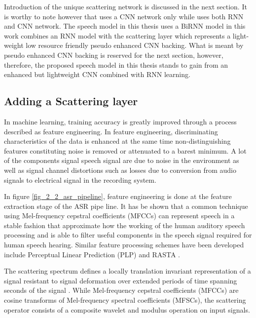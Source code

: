 Introduction of the unique scattering network is discussed in the next section.  It is worthy to note however that \cite{kunze2017transfer} uses a CNN network only while \citep{amodei2016deep} uses both RNN and CNN network.  The speech model in this thesis uses a BiRNN model in this work combines an RNN model with the scattering layer which represents a light-weight low resource friendly pseudo enhanced CNN backing.  What is meant by pseudo enhanced CNN backing is reserved for the next section, however, therefore, the proposed speech model in this thesis stands to gain from an enhanced but lightweight CNN combined with RNN learning.

\subsection{Adding a Scattering layer}

In machine learning, training accuracy is greatly improved through a process described as feature engineering.  In feature engineering, discriminating characteristics of the data is enhanced at the same time non-distinguishing features constituting noise is removed or attenuated to a barest minimum.  A lot of the components signal speech signal are due to noise in the environment as well as signal channel distortions such as losses due to conversion from audio signals to electrical signal in the recording system.

In figure \ref{fig_2_2_asr_pipeline}, feature engineering is done at the feature extraction stage of the ASR pipe line. It has be shown that a common technique using Mel-frequency cepstral coefficients (MFCCs) \citep{davis1990comparison} can represent speech in a stable fashion that approximate how the working of the human auditory speech processing and is able to filter useful components in the speech signal required for human speech hearing. Similar feature processing schemes have been developed include Perceptual Linear Prediction (PLP) \citep{hermansky1990perceptual} and RASTA \citep{hermansky1994rasta}. 

The scattering spectrum defines a locally translation invariant representation of a signal resistant to signal deformation over extended periods of time spanning seconds of the signal \citep{anden2014deep}. While Mel-frequency cepstral coefficients (MFCCs) are cosine transforms of Mel-frequency spectral coefficients (MFSCs), the scattering operator consists of a composite wavelet and modulus operation on input signals. 

